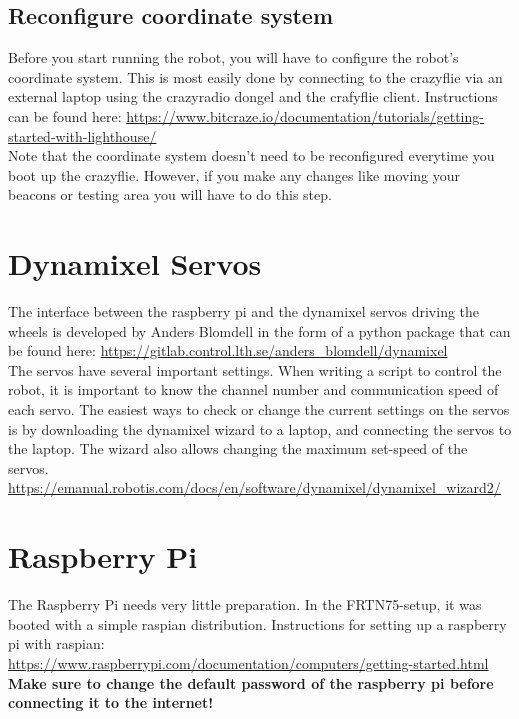 \documentclass[10pt,a4paper]{article}
\begin{document}
	\subsection{Reconfigure coordinate system}
		Before you start running the robot, you will have to configure the robot's coordinate system. This is most easily done by connecting to the crazyflie via an external laptop using the crazyradio dongel and the crafyflie client. Instructions can be found here:
		\url{https://www.bitcraze.io/documentation/tutorials/getting-started-with-lighthouse/}
		\\
		
		Note that the coordinate system doesn't need to be reconfigured everytime you boot up the crazyflie. However, if you make any changes like moving your beacons or testing area you will have to do this step.
		
	\section{Dynamixel Servos}
	
	The interface between the raspberry pi and the dynamixel servos driving the wheels is developed by Anders Blomdell in the form of a python package that can be found here:
	\url{https://gitlab.control.lth.se/anders_blomdell/dynamixel}
	\\
	
	The servos have several important settings. When writing a script to control the robot, it is important to know the channel number and communication speed of each servo. The easiest ways to check or change the current settings on the servos is by downloading the dynamixel wizard to a laptop, and connecting the servos to the laptop. The wizard also allows changing the maximum set-speed of the servos.
	\url{https://emanual.robotis.com/docs/en/software/dynamixel/dynamixel_wizard2/}
	
	\section{Raspberry Pi}
	The Raspberry Pi needs very little preparation. In the FRTN75-setup, it was booted with a simple raspian distribution. Instructions for setting up a raspberry pi with raspian:
	\url{https://www.raspberrypi.com/documentation/computers/getting-started.html}
	\textbf{Make sure to change the default password of the raspberry pi before connecting it to the internet!}
	\\
	
\end{document}
